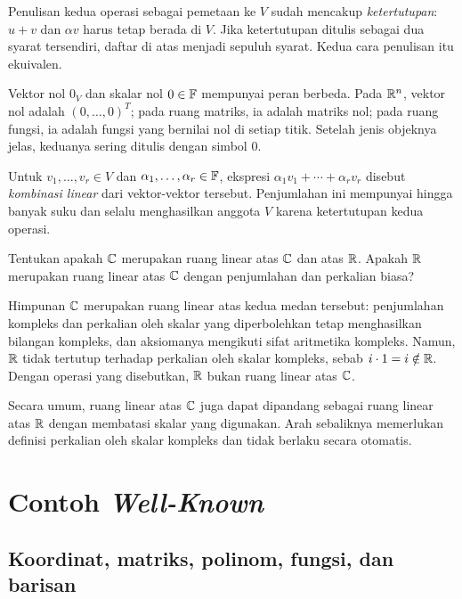 Penulisan kedua operasi sebagai pemetaan ke $V$ sudah mencakup
\emph{ketertutupan}: $u+v$ dan $\alpha v$ harus tetap berada di $V$.
Jika ketertutupan ditulis sebagai dua syarat tersendiri, daftar di
atas menjadi sepuluh syarat. Kedua cara penulisan itu ekuivalen.

Vektor nol $0_V$ dan skalar nol $0\in\mathbb{F}$ mempunyai peran berbeda.
Pada $\mathbb{R}^n$, vektor nol adalah $(0,\ldots,0)^T$; pada ruang matriks,
ia adalah matriks nol; pada ruang fungsi, ia adalah fungsi yang
bernilai nol di setiap titik. Setelah jenis objeknya jelas, keduanya
sering ditulis dengan simbol $0$.

Untuk $v_1,\ldots,v_r\in V$ dan $\alpha_1,\ldots,\alpha_r\in\mathbb{F}$,
ekspresi $\alpha_1v_1+\cdots+\alpha_rv_r$ disebut
\emph{kombinasi linear} dari vektor-vektor tersebut.
Penjumlahan ini mempunyai hingga banyak suku dan selalu
menghasilkan anggota $V$ karena ketertutupan kedua operasi.

\begin{exam}
    Tentukan apakah $\mathbb{C}$ merupakan ruang linear atas $\mathbb{C}$ dan atas
    $\mathbb{R}$. Apakah $\mathbb{R}$ merupakan ruang linear atas $\mathbb{C}$ dengan
    penjumlahan dan perkalian biasa?
\end{exam}
\begin{solution}
    Himpunan $\mathbb{C}$ merupakan ruang linear atas kedua medan tersebut:
    penjumlahan kompleks dan perkalian oleh skalar yang diperbolehkan
    tetap menghasilkan bilangan kompleks, dan aksiomanya mengikuti
    sifat aritmetika kompleks.
    Namun, $\mathbb{R}$ tidak tertutup terhadap perkalian oleh skalar kompleks,
    sebab $i\cdot1=i\notin\mathbb{R}$. Dengan operasi yang disebutkan,
    $\mathbb{R}$ bukan ruang linear atas $\mathbb{C}$.
\end{solution}

Secara umum, ruang linear atas $\mathbb{C}$ juga dapat dipandang sebagai
ruang linear atas $\mathbb{R}$ dengan membatasi skalar yang digunakan.
Arah sebaliknya memerlukan definisi perkalian oleh skalar kompleks
dan tidak berlaku secara otomatis.

\section{Contoh \emph{Well-Known}}
\label{linear:contoh}

\subsection{Koordinat, matriks, polinom, fungsi, dan barisan}

